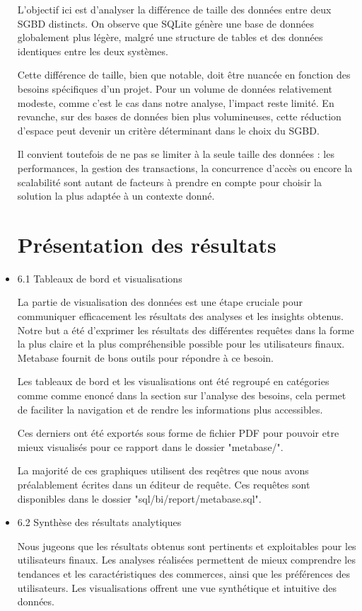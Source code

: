 \begin{itemize}
L’objectif ici est d’analyser la différence de taille des données entre deux SGBD distincts. On observe que SQLite génère une base de données globalement plus légère, malgré une structure de tables et des données identiques entre les deux systèmes.

Cette différence de taille, bien que notable, doit être nuancée en fonction des besoins spécifiques d’un projet. Pour un volume de données relativement modeste, comme c’est le cas dans notre analyse, l’impact reste limité. En revanche, sur des bases de données bien plus volumineuses, cette réduction d’espace peut devenir un critère déterminant dans le choix du SGBD.

Il convient toutefois de ne pas se limiter à la seule taille des données : les performances, la gestion des transactions, la concurrence d’accès ou encore la scalabilité sont autant de facteurs à prendre en compte pour choisir la solution la plus adaptée à un contexte donné.


\chapter*{Présentation des résultats}


\item 6.1 Tableaux de bord et visualisations

La partie de visualisation des données est une étape cruciale pour communiquer efficacement les résultats des analyses et les insights obtenus.
Notre but a été d'exprimer les résultats des différentes requêtes dans la forme la plus claire et la plus compréhensible possible pour les utilisateurs finaux.
Metabase fournit de bons outils pour répondre à ce besoin.

Les tableaux de bord et les visualisations ont été regroupé en catégories comme comme enoncé dans la section sur l'analyse des besoins, cela permet de faciliter la navigation et de rendre les informations plus accessibles.

Ces derniers ont été exportés sous forme de fichier PDF pour pouvoir etre mieux visualisés pour ce rapport dans le dossier "metabase/".

La majorité de ces graphiques utilisent des reqêtres que nous avons préalablement écrites dans un éditeur de requête.
Ces requêtes sont disponibles dans le dossier "sql/bi/report/metabase.sql".

\item 6.2 Synthèse des résultats analytiques

Nous jugeons que les résultats obtenus sont pertinents et exploitables pour les utilisateurs finaux.
Les analyses réalisées permettent de mieux comprendre les tendances et les caractéristiques des commerces, ainsi que les préférences des utilisateurs.
Les visualisations offrent une vue synthétique et intuitive des données.


\end{itemize}
